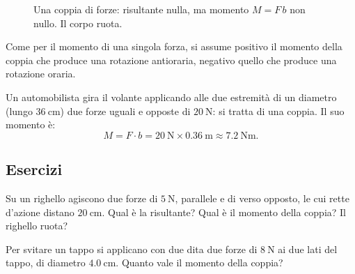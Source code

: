 \begin{figure}[h!]
\centering
{}
\caption{Una coppia di forze: risultante nulla, ma momento $M = F\,b$ non nullo. Il corpo ruota.}
\label{fig:coppia}
\end{figure}

Come per il momento di una singola forza, si assume positivo il momento della coppia che produce una rotazione antioraria, negativo quello che produce una rotazione oraria.

\begin{testexample}
Un automobilista gira il volante applicando alle due estremità di un diametro (lungo $\SI{36}{\centi\meter}$) due forze uguali e opposte di $\SI{20}{\newton}$: si tratta di una coppia. Il suo momento è:
\[
M = F\cdot b = \SI{20}{\newton}\times\SI{0,36}{\meter} \approx \SI{7,2}{\newton\meter}.
\]
\end{testexample}

\subsection{Esercizi}

\begin{esercizio}
Su un righello agiscono due forze di $\SI{5}{\newton}$, parallele e di verso opposto, le cui rette d'azione distano $\SI{20}{\centi\meter}$. Qual è la risultante? Qual è il momento della coppia? Il righello ruota?\\
\end{esercizio}

\begin{esercizio}
Per svitare un tappo si applicano con due dita due forze di $\SI{8}{\newton}$ ai due lati del tappo, di diametro $\SI{4,0}{\centi\meter}$. Quanto vale il momento della coppia?\\
\end{esercizio}

